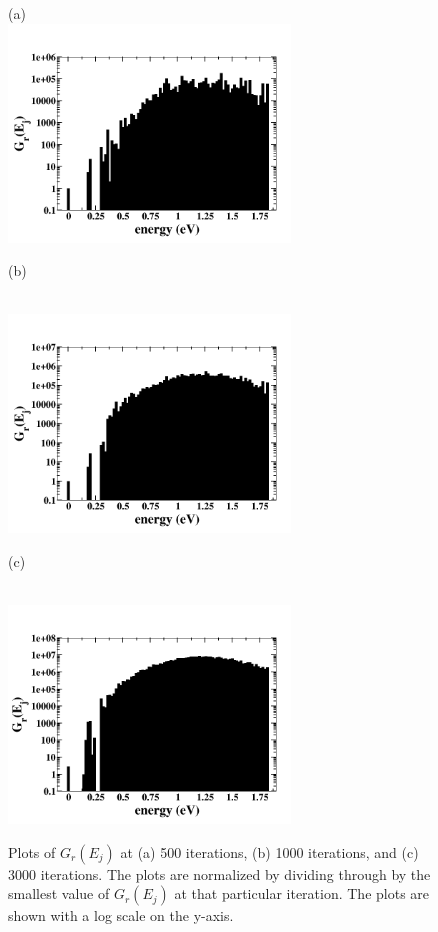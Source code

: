\documentclass[aps,pre,reprint,superscriptaddress,showkeys]{revtex4-1}
\begin{document}
\begin{figure}[h!]
(a)\\
\includegraphics[width=7.5cm]{./figures/GE_fig_500.png}
\centerline{(b)}\\
\includegraphics[width=7.5cm]{./figures/GE_fig_1000.png}
\centerline{(c)}\\
\includegraphics[width=7.5cm]{./figures/GE_fig_3000.png}
\caption{Plots of $G_r(E_j)$ at (a) 500 iterations, (b) 1000 iterations, and (c) 3000 iterations. The plots are normalized by dividing through by the smallest value of $G_r(E_j)$ at that particular iteration. The plots are shown with a log scale on the y-axis.  \label{converge_GE}}
\end{figure}
\end{document}
